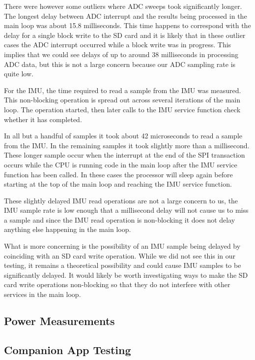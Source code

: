 There were however some outliers where ADC sweeps took significantly longer.
The longest delay between ADC interrupt and the results being processed in the
main loop was about 15.8 milliseconds. This time happens to correspond with the
delay for a single block write to the SD card and it is likely that in these
outlier cases the ADC interrupt occurred while a block write was in progress.
This implies that we could see delays of up to around 38 milliseconds in
processing ADC data, but this is not a large concern because our ADC sampling
rate is quite low.

For the IMU, the time required to read a sample from the IMU was measured. This
non-blocking operation is spread out across several iterations of the main loop.
The operation started, then later calls to the IMU service function check
whether it has completed.

In all but a handful of samples it took about 42 microseconds to read a sample
from the IMU. In the remaining samples it took slightly more than a millisecond.
These longer sample occur when the interrupt at the end of the SPI transaction
occurs while the CPU is running code in the main loop after the IMU service
function has been called. In these cases the processor will sleep again before
starting at the top of the main loop and reaching the IMU service function.

These slightly delayed IMU read operations are not a large concern to us, the
IMU sample rate is low enough that a millisecond delay will not cause us to
miss a sample and since the IMU read operation is non-blocking it does not delay
anything else happening in the main loop.

What is more concerning is the possibility of an IMU sample being delayed by
coinciding with an SD card write operation. While we did not see this in our
testing, it remains a theoretical possibility and could cause IMU samples to be
significantly delayed. It would likely be worth investigating ways to make the
SD card write operations non-blocking so that they do not interfere with other
services in the main loop.

\subsection{Power Measurements}

\subsection{Companion App Testing}

